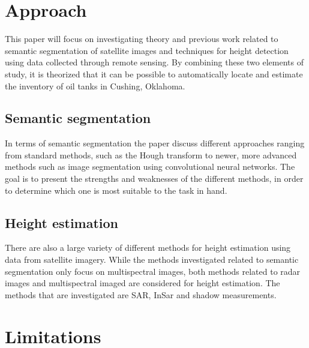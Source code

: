 \section{Approach}

This paper will focus on investigating theory and previous work related to semantic segmentation of satellite images and techniques for height detection using data collected through remote sensing. By combining these two elements of study, it is theorized that it can be possible to automatically locate and estimate the inventory of oil tanks in Cushing, Oklahoma.

\subsection*{Semantic segmentation}
In terms of semantic segmentation the paper discuss different approaches ranging from standard methods, such as the Hough transform to newer, more advanced methods such as image segmentation using convolutional neural networks. The goal is to present the strengths and weaknesses of the different methods, in order to determine which one is most suitable to the task in hand. 

\subsection*{Height estimation}
There are also a large variety of different methods for height estimation using data from satellite imagery. While the methods investigated related to semantic segmentation only focus on multispectral images, both methods related to radar images and multispectral imaged are considered for height estimation. The methods that are investigated are SAR, InSar and shadow measurements.

\section{Limitations}

